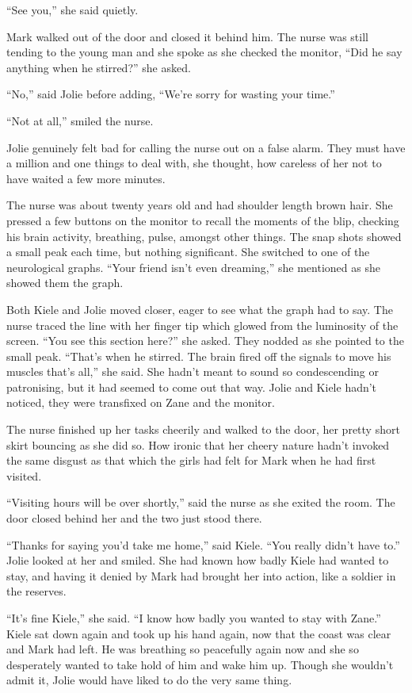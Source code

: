 ``See you,'' she said quietly.  

Mark walked out of the door and closed it behind him.  The nurse was still tending to the young man and she spoke as she checked the monitor, ``Did he say anything when he stirred?'' she asked.

``No,'' said Jolie before adding, ``We're sorry for wasting your time.''  

``Not at all,'' smiled the nurse.  

Jolie genuinely felt bad for calling the nurse out on a false alarm.  They must have a million and one things to deal with, she thought, how careless of her not to have waited a few more minutes.

The nurse was about twenty years old and had shoulder length brown hair.  She pressed a few buttons on the monitor to recall the moments of the blip, checking his brain activity, breathing, pulse, amongst other things.  The snap shots showed a small peak each time, but nothing significant.  She switched to one of the neurological graphs.  ``Your friend isn't even dreaming,'' she mentioned as she showed them the graph.  

Both Kiele and Jolie moved closer, eager to see what the graph had to say.  The nurse traced the line with her finger tip which glowed from the luminosity of the screen.  ``You see this section here?'' she asked.  They nodded as she pointed to the small peak.  ``That's when he stirred.  The brain fired off the signals to move his muscles that's all,'' she said.  She hadn't meant to sound so condescending or patronising, but it had seemed to come out that way.  Jolie and Kiele hadn't noticed, they were transfixed on Zane and the monitor.

The nurse finished up her tasks cheerily and walked to the door, her pretty short skirt bouncing as she did so.  How ironic that her cheery nature hadn't invoked the same disgust as that which the girls had felt for Mark when he had first visited.  

``Visiting hours will be over shortly,'' said the nurse as she exited the room.  The door closed behind her and the two just stood there.

``Thanks for saying you'd take me home,'' said Kiele.  ``You really didn't have to.''  Jolie looked at her and smiled.  She had known how badly Kiele had wanted to stay, and having it denied by Mark had brought her into action, like a soldier in the reserves.  

``It's fine Kiele,'' she said.  ``I know how badly you wanted to stay with Zane.''  Kiele sat down again and took up his hand again, now that the coast was clear and Mark had left.  He was breathing so peacefully again now and she so desperately wanted to take hold of him and wake him up.  Though she wouldn't admit it, Jolie would have liked to do the very same thing.  

